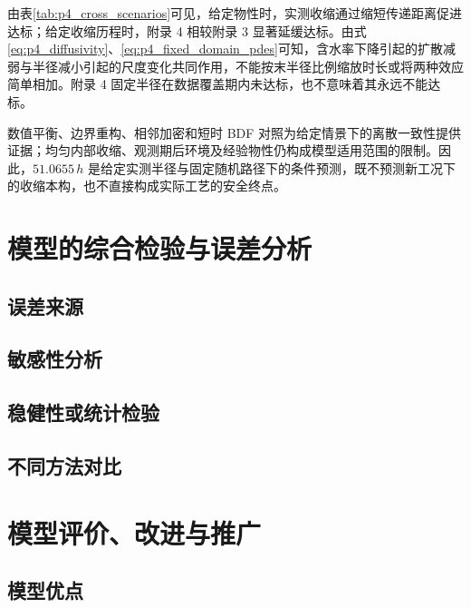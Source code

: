 \documentclass[withoutpreface,bwprint]{cumcmthesis}
\begin{document}
由表\ref{tab:p4_cross_scenarios}可见，给定物性时，实测收缩通过缩短传递距离促进达标；给定收缩历程时，附录 4 相较附录 3 显著延缓达标。由式\eqref{eq:p4_diffusivity}、\eqref{eq:p4_fixed_domain_pdes}可知，含水率下降引起的扩散减弱与半径减小引起的尺度变化共同作用，不能按末半径比例缩放时长或将两种效应简单相加。附录 4 固定半径在数据覆盖期内未达标，也不意味着其永远不能达标。

数值平衡、边界重构、相邻加密和短时 BDF 对照为给定情景下的离散一致性提供证据；均匀内部收缩、观测期后环境及经验物性仍构成模型适用范围的限制。因此，$51.0655\,\si{h}$ 是给定实测半径与固定随机路径下的条件预测，既不预测新工况下的收缩本构，也不直接构成实际工艺的安全终点。

\clearpage
\section{模型的综合检验与误差分析}

\subsection{误差来源}
\vspace{0.08\textheight}

\subsection{敏感性分析}
\vspace{0.08\textheight}

\subsection{稳健性或统计检验}
\vspace{0.08\textheight}

\subsection{不同方法对比}
\vspace{0.08\textheight}

\clearpage
\section{模型评价、改进与推广}

\subsection{模型优点}
\vspace{0.06\textheight}
\end{document}
